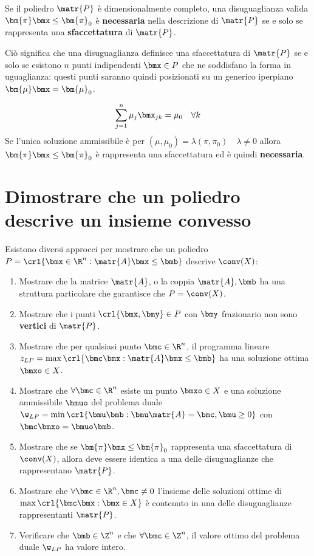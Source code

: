 \documentclass[\main/main.tex]{subfiles}
\begin{document}
\begin{proposition}
    Se il poliedro \(\matr{P}\) è dimensionalmente completo, una disuguaglianza valida \(\bm{\pi}\bmx \leq \bm{\pi}_0\) è \textbf{necessaria} nella descrizione di \(\matr{P}\) se e solo se rappresenta una \textbf{sfaccettatura} di \(\matr{P}\).

    Ciò significa che una disuguaglianza definisce una sfaccettatura di \(\matr{P}\) se e solo se esistono \(n\) punti indipendenti \(\bmx \in P\) che ne soddisfano la forma in uguaglianza: questi punti saranno quindi posizionati su un generico iperpiano \(\bm{\mu}\bmx = \bm{\mu}_0\).

    \[
        \sum_{j=1}^n \mu_j\bmx_{jk} = \mu_0 \quad \forall k
    \]
    Se l'unica soluzione ammissibile è per \((\mu, \mu_0) = \lambda (\pi, \pi_0) \quad \lambda \neq 0\) allora \(\bm{\pi}\bmx \leq \bm{\pi}_0\) è rappresenta una sfaccettatura ed è quindi \textbf{necessaria}.
\end{proposition}

\section{Dimostrare che un poliedro descrive un insieme convesso}
Esistono diversi approcci per mostrare che un poliedro \(P = \crl{\bmx \in \R^n: \matr{A}\bmx \leq \bmb}\) descrive \(\conv(X)\):

\begin{enumerate}
    \item Mostrare che la matrice \(\matr{A}\), o la coppia \(\matr{A}, \bmb \) ha una struttura particolare che garantisce che \(P = \conv(X)\).
    \item Mostrare che i punti \(\crl{\bmx, \bmy} \in P\) con \(\bmy \) frazionario non sono \textbf{vertici} di \(\matr{P}\).
    \item Mostrare che per qualsiasi punto \(\bmc \in \R^n\), il programma lineare \(z_{LP} = \max\crl{\bmc\bmx: \matr{A}\bmx \leq \bmb}\) ha una soluzione ottima \(\bmxo \in X\).
    \item Mostrare che \(\forall \bmc \in \R^n \) esiste un punto \(\bmxo \in X\) e una soluzione ammissibile \(\bmuo \) del problema duale \(\w_{LP} = \min\crl{\bmu\bmb: \bmu \matr{A} = \bmc, \bmu \geq 0}\) con \(\bmc\bmxo = \bmuo\bmb \).
    \item Mostrare che se \(\bm{\pi}\bmx \leq \bm{\pi}_0\) rappresenta una sfaccettatura di \(\conv(X)\), allora deve essere identica a una delle disuguaglianze che rappresentano \(\matr{P}\).
    \item Mostrare che \(\forall \bmc \in \R^n, \bmc \neq 0 \) l'insieme delle soluzioni ottime di \(\max\crl{\bmc\bmx: \bmx \in X}\) è contenuto in una delle disuguaglianze rappresentanti \(\matr{P}\).
    \item Verificare che \(\bmb \in \Z^n\) e che \(\forall \bmc \in \Z^n\), il valore ottimo del problema duale \(\w_{LP}\) ha valore intero.
\end{enumerate}
\end{document}
